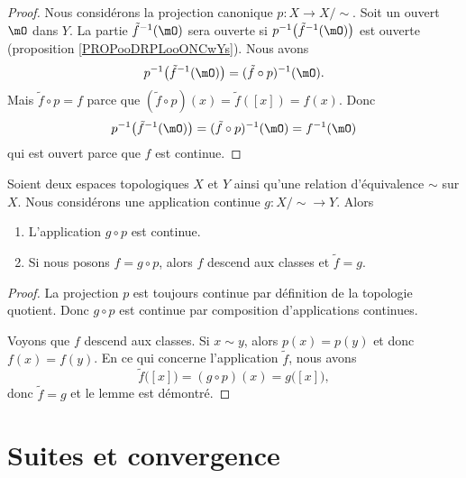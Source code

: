 \begin{proof}
    Nous considérons la projection canonique \( p\colon X\to X/\sim\). Soit un ouvert \( \mO\) dans \( Y\). La partie \( \tilde f^{-1}(\mO)\) sera ouverte si \( p^{-1}\big( \tilde f^{-1}(\mO) \big)\) est ouverte (proposition \ref{PROPooDRPLooONCwYs}). Nous avons
    \begin{equation}
        p^{-1}\big( \tilde f^{-1}(\mO) \big)=(\tilde f\circ p)^{-1}(\mO).
    \end{equation}
    Mais \( \tilde f\circ p=f\) parce que \( (\tilde f\circ p)(x)=\tilde f([x])=f(x)\). Donc
    \begin{equation}
        p^{-1}\big( \tilde f^{-1}(\mO) \big)=(\tilde f\circ p)^{-1}(\mO)=f^{-1}(\mO)
    \end{equation}
    qui est ouvert parce que \( f\) est continue.
\end{proof}

\begin{lemma}
    Soient deux espaces topologiques \( X\) et \( Y\) ainsi qu'une relation d'équivalence \( \sim\) sur \( X\). Nous considérons une application continue \( g\colon X/\sim\to Y\). Alors
    \begin{enumerate}
        \item
            L'application \( g\circ p\) est continue.
        \item
            Si nous posons \( f=g\circ p\), alors \( f\) descend aux classes et \( \tilde f=g\).
    \end{enumerate}
\end{lemma}

\begin{proof}
    La projection \( p\) est toujours continue par définition de la topologie quotient. Donc \( g\circ p\) est continue par composition d'applications continues.

    Voyons que \( f\) descend aux classes. Si \( x\sim y\), alors \( p(x)=p(y)\) et donc \( f(x)=f(y)\). En ce qui concerne l'application \( \tilde f\), nous avons 
    \begin{equation}
        \tilde f\big( [x] \big)=(g\circ p)(x)=g\big( [x] \big),
    \end{equation}
    donc \( \tilde f=g\) et le lemme est démontré.
\end{proof}

\section{Suites et convergence}

